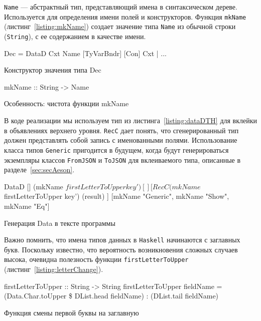 \lstinline{Name} --- абстрактный тип, представляющий имена в синтаксическом дереве. Используется для определения имени полей и конструкторов. Функция \lstinline{mkName} (листинг~\ref{listing:mkName}) создает значение типа \lstinline{Name} из обычной строки (\lstinline{String}), с ее содержанием в качестве имени.

\begin{ListingEnv}[H]
\begin{Verb}
Dec 
   = DataD Cxt Name [TyVarBndr] [Con] Cxt
   | ...
\end{Verb}
\caption{Конструктор значения типа Dec}
\label{listing:dataDTH}
\end{ListingEnv} 

\begin{ListingEnv}[H]
\begin{Verb}
mkName :: String -> Name
\end{Verb}
\caption{Особенность: чистота функции mkName}
\label{listing:mkName}
\end{ListingEnv} 

В коде реализации мы используем тип из листинга~\ref{listing:dataDTH} для вклейки в объявлениях верхнего уровня. \lstinline{RecC} дает понять, что сгенерированный тип должен представлять собой запись с именованными полями. Использование класса типов \lstinline{Generic} пригодится в будущем, когда будут генерироваться экземпляры классов \lstinline{FromJSON} и \lstinline{ToJSON} для вклеиваемого типа, описанные в разделе~\ref{sec:secAeson}.

\begin{ListingEnv}[H]
\begin{Verb}
DataD
     []
     (mkName $ firstLetterToUpper key')
     []
     [ RecC (mkName $ firstLetterToUpper key')  (result) ]
     [mkName "Generic", mkName "Show", mkName "Eq"]
\end{Verb}
\caption{Генерация Data в тексте программы}
\label{listing:dataDTHjson}
\end{ListingEnv} 

Важно помнить, что имена типов данных в \lstinline{Haskell} начинаются с заглавных букв. Поскольку известно, что вероятность возникновения сложных случаев высока, очевидна полезность функции \lstinline{firstLetterToUpper} (листинг~\ref{listing:letterChange}).

\begin{ListingEnv}[H]
\begin{Verb}
firstLetterToUpper :: String -> String
firstLetterToUpper fieldName = (Data.Char.toUpper 
                                         \$ DList.head fieldName)
                                         : (DList.tail fieldName)
\end{Verb}
\caption{Функция смены первой буквы на заглавную}
\label{listing:letterChange}
\end{ListingEnv} 

